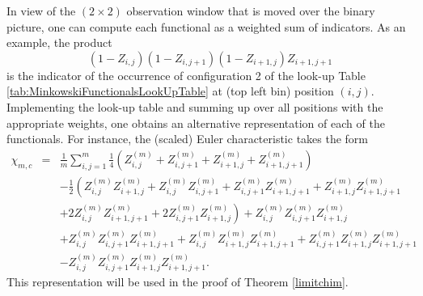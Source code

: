 \documentclass[12pt]{article}
\begin{document}
In view of the $(2\times2)$ observation window that is moved over the binary picture, one can compute each functional as a weighted sum of indicators. As an example, the product
\begin{equation*}
(1-Z_{i,j})(1-Z_{i,j+1})(1-Z_{i+1,j})Z_{i+1,j+1}
\end{equation*}
 is the indicator of the occurrence of configuration 2 of the look-up Table \ref{tab:MinkowskiFunctionalsLookUpTable} at (top left bin) position $(i,j)$. Implementing the look-up table and summing up over all positions with the appropriate weights, one obtains an alternative representation of each of the functionals. For instance, the (scaled) Euler characteristic takes the form
\begin{eqnarray}
\chi_{m,c}&=&\frac1m\sum_{i,j=1}^m\frac14\left(Z_{i,j}^{(m)}+Z_{i,j+1}^{(m)}+Z_{i+1,j}^{(m)}+Z_{i+1,j+1}^{(m)}\right)\nonumber\\
&&-\frac12\left(Z_{i,j}^{(m)}Z_{i+1,j}^{(m)}+Z_{i,j}^{(m)}Z_{i,j+1}^{(m)}+Z_{i,j+1}^{(m)}Z_{i+1,j+1}^{(m)}+Z_{i+1,j}^{(m)}Z_{i+1,j+1}^{(m)}\right.\nonumber\\
&&\left.+2Z_{i,j}^{(m)}Z_{i+1,j+1}^{(m)}+2Z_{i,j+1}^{(m)}Z_{i+1,j}^{(m)}\right)+Z_{i,j}^{(m)}Z_{i,j+1}^{(m)}Z_{i+1,j}^{(m)}\nonumber\\
&&+Z_{i,j}^{(m)}Z_{i,j+1}^{(m)}Z_{i+1,j+1}^{(m)}+Z_{i,j}^{(m)}Z_{i+1,j}^{(m)}Z_{i+1,j+1}^{(m)}+Z_{i,j+1}^{(m)}Z_{i+1,j}^{(m)}Z_{i+1,j+1}^{(m)}\nonumber\\
&&-Z_{i,j}^{(m)}Z_{i,j+1}^{(m)}Z_{i+1,j}^{(m)}Z_{i+1,j+1}^{(m)}.\label{altrepeuler}
\end{eqnarray}
This representation will be used in the proof of Theorem \ref{limitchim}.




\end{document}
